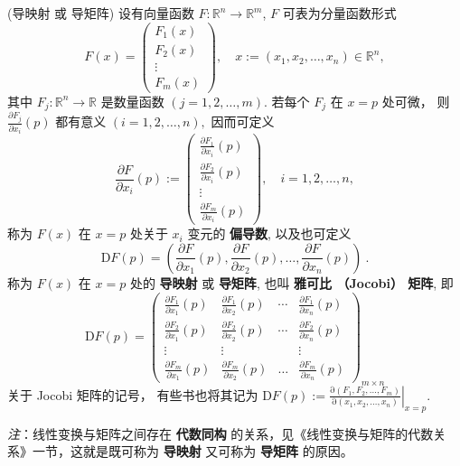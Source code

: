 \begin{definition}{(导映射 或 导矩阵)}
设有向量函数 $F:\mathbb{R}^{n}\rightarrow\mathbb{R}^{m}$, $F$ 可表为分量函数形式
$$
F(x)=\left(\begin{array}{c}
F_{1}(x)\\
F_{2}(x)\\
\vdots\\
F_{m}(x)
\end{array}\right),\quad x:=(x_{1},x_{2},\ldots,x_{n})\in\mathbb{R}^{n},
$$
其中 $F_{j}:\mathbb{R}^{n}\rightarrow\mathbb{R}$ 是数量函数 $(j=1,2,\ldots,m)$.
若每个 $F_{j}$ 在 $x=p$ 处可微， 则 ${\displaystyle \frac{\partial F_{j}}{\partial x_{i}}(p)}$
都有意义 $(i=1,2,\ldots,n),$ 因而可定义
$$
{\displaystyle \frac{\partial F}{\partial x_{i}}(p):=\left(\begin{array}{c}
\frac{\partial F_{1}}{\partial x_{i}}(p)\\
\frac{\partial F_{2}}{\partial x_{i}}(p)\\
\vdots\\
\frac{\partial F_{m}}{\partial x_{i}}(p)
\end{array}\right),\quad i=1,2,\ldots,n,}
$$
称为 $F(x)$ 在 $x=p$ 处关于 $x_{i}$ 变元的 \textbf{偏导数}, 以及也可定义
\[
\mathrm{D}F(p)=(\frac{\partial F}{\partial x_{1}}(p),\frac{\partial F}{\partial x_{2}}(p),\ldots,\frac{\partial F}{\partial x_{n}}(p))~.
\]
称为 $F(x)$ 在 $x=p$ 处的 \textbf{导映射} 或 \textbf{导矩阵}, 也叫 \textbf{雅可比 （Jocobi）
矩阵}, 即
$$
\mathrm{D}F(p)=\left(\begin{array}{cccc}
\frac{\partial F_{1}}{\partial x_{1}}(p) & \frac{\partial F_{1}}{\partial x_{2}}(p) & \cdots & \frac{\partial F_{1}}{\partial x_{n}}(p)\\
\frac{\partial F_{2}}{\partial x_{1}}(p) & \frac{\partial F_{2}}{\partial x_{2}}(p) & \cdots & \frac{\partial F_{2}}{\partial x_{n}}(p)\\
\vdots & \vdots &  & \vdots\\
\frac{\partial F_{m}}{\partial x_{1}}(p) & \frac{\partial F_{m}}{\partial x_{2}}(p) & \ldots & \frac{\partial F_{m}}{\partial x_{n}}(p)
\end{array}\right)_{m\times n}
$$
关于 Jocobi 矩阵的记号， 有些书也将其记为 $\mathrm{D}F(p):={\displaystyle \left.\frac{\mathrm{\partial}(F_{1},F_{2},\ldots,F_{m})}{\mathrm{\partial}(x_{1},x_{2},\ldots,x_{n})}\right|_{x=p}.}$
\end{definition}

\textsl{注}：线性变换与矩阵之间存在 \textbf{代数同构} 的关系，见《线性变换与矩阵的代数关系》一节，这就是既可称为 \textbf{导映射} 又可称为\textbf{ 导矩阵} 的原因。 


